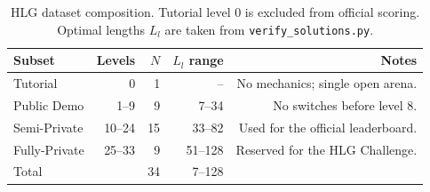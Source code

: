\begin{table}[h]
\centering
\caption{HLG dataset composition. Tutorial level 0 is excluded from official scoring.
Optimal lengths $L_l$ are taken from \texttt{verify\_solutions.py}.}
\label{tab:dataset}
\begin{tabular}{@{}lrrrr@{}}
\toprule
\textbf{Subset} & \textbf{Levels} & \textbf{$N$} & \textbf{$L_l$ range} & \textbf{Notes} \\
\midrule
Tutorial      & 0          & 1  & --            & No mechanics; single open arena. \\
Public Demo   & 1--9       & 9  & 7--34         & No switches before level 8. \\
Semi-Private  & 10--24     & 15 & 33--82        & Used for the official leaderboard. \\
Fully-Private & 25--33     & 9  & 51--128       & Reserved for the HLG Challenge. \\
\midrule
Total         &            & 34 & 7--128        & \\
\bottomrule
\end{tabular}
\end{table}
